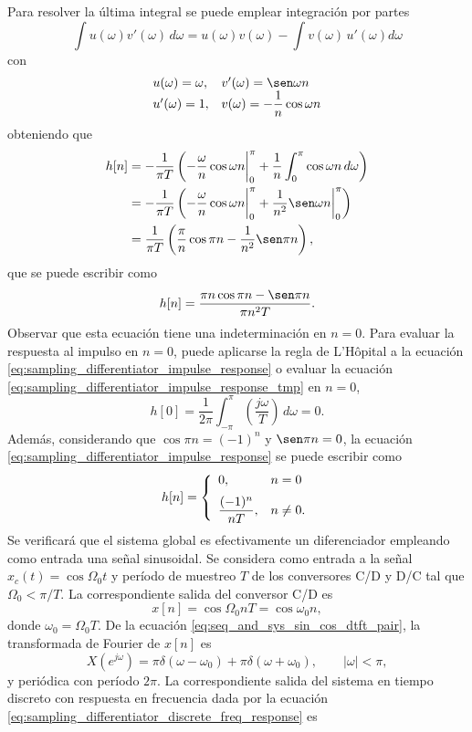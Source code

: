 \documentclass[a4paper]{report}
\begin{document}
Para resolver la última integral se puede emplear integración por partes
\[
 \int u(\omega)v'(\omega)\,d\omega=u(\omega)v(\omega)-\int v(\omega)\,u'(\omega)d\omega
\]
con
\[
 \begin{array}{ll}
  u(\omega)=\omega, & v'(\omega)=\sen\omega n\\
  u'(\omega)=1, & v(\omega) = -\dfrac{1}{n}\cos\omega n
 \end{array} 
\]
obteniendo que
\begin{align*}
 h[n]&=-\frac{1}{\pi T}\left(-\frac{\omega}{n}\cos\omega n\bigg|_{0}^{\pi}+\dfrac{1}{n}\int_{0}^{\pi}\cos\omega n\,d\omega\right)\\
  &=-\frac{1}{\pi T}\left(-\frac{\omega}{n}\cos\omega n\bigg|_{0}^{\pi}+\dfrac{1}{n^2}\sen\omega n\bigg|_{0}^{\pi}\right)\\
  &=\frac{1}{\pi T}\left(\frac{\pi}{n}\cos\pi n-\dfrac{1}{n^2}\sen\pi n\right),
\end{align*}
que se puede escribir como
\begin{equation}\label{eq:sampling_differentiator_impulse_response}
 h[n]=\frac{\pi n\cos\pi n-\sen\pi n}{\pi n^2T}. 
\end{equation}
Observar que esta ecuación tiene una indeterminación en \(n=0\). Para evaluar la respuesta al impulso en \(n=0\), puede aplicarse la regla de L'Hôpital a la ecuación \ref{eq:sampling_differentiator_impulse_response} o evaluar la ecuación \ref{eq:sampling_differentiator_impulse_response_tmp} en \(n=0\),
\[
 h[0]=\frac{1}{2\pi}\int_{-\pi}^{\pi}\left(\frac{j\omega}{T}\right)\,d\omega=0.
\]
Además, considerando que \(\cos\pi n=(-1)^n\) y \(\sen\pi n=0\), la ecuación \ref{eq:sampling_differentiator_impulse_response} se puede escribir como
\[
 h[n]
  =\left\{
  \begin{array}{ll}
   0, & n=0 \\[\medskipamount]
   \dfrac{(-1)^n}{nT}, & n\neq0.
  \end{array}
  \right. 
\]
Se verificará que el sistema global es efectivamente un diferenciador empleando como entrada una señal sinusoidal. Se considera como entrada a la señal \(x_c(t)=\cos\Omega_0t\) y período de muestreo \(T\) de los conversores C/D y D/C tal que \(\Omega_0<\pi/T\). La correspondiente salida del conversor C/D es
\[
 x[n]=\cos\Omega_0nT=\cos\omega_0n,
\]
donde \(\omega_0=\Omega_0T\). De la ecuación \ref{eq:seq_and_sys_sin_cos_dtft_pair}, la transformada de Fourier de \(x[n]\) es
\[
 X(e^{j\omega})=\pi\delta(\omega-\omega_0)+\pi\delta(\omega+\omega_0),
 \qquad |\omega|<\pi,
\]
y periódica con período \(2\pi\). La correspondiente salida del sistema en tiempo discreto con respuesta en frecuencia dada por la ecuación \ref{eq:sampling_differentiator_discrete_freq_response} es
\end{document}
